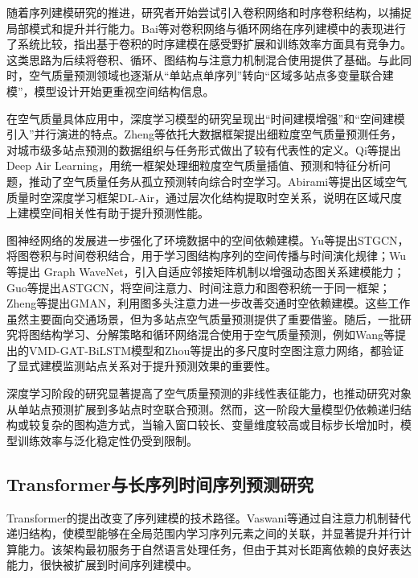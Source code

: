 随着序列建模研究的推进，研究者开始尝试引入卷积网络和时序卷积结构，以捕捉局部模式和提升并行能力。Bai等对卷积网络与循环网络在序列建模中的表现进行了系统比较，指出基于卷积的时序建模在感受野扩展和训练效率方面具有竞争力\cite{bai_empirical_2018}。这类思路为后续将卷积、循环、图结构与注意力机制混合使用提供了基础。与此同时，空气质量预测领域也逐渐从“单站点单序列”转向“区域多站点多变量联合建模”，模型设计开始更重视空间结构信息。

在空气质量具体应用中，深度学习模型的研究呈现出“时间建模增强”和“空间建模引入”并行演进的特点。Zheng等依托大数据框架提出细粒度空气质量预测任务，对城市级多站点预测的数据组织与任务形式做出了较有代表性的定义\cite{zheng_forecasting_2015}。Qi等提出 Deep Air Learning，用统一框架处理细粒度空气质量插值、预测和特征分析问题，推动了空气质量任务从孤立预测转向综合时空学习\cite{qi_deep_2018}。Abirami等提出区域空气质量时空深度学习框架DL-Air，通过层次化结构提取时空关系，说明在区域尺度上建模空间相关性有助于提升预测性能\cite{abirami_regional_2021}。

图神经网络的发展进一步强化了环境数据中的空间依赖建模。Yu等提出STGCN，将图卷积与时间卷积结合，用于学习图结构序列的空间传播与时间演化规律\cite{yu_spatio-temporal_2018}；Wu等提出 Graph WaveNet，引入自适应邻接矩阵机制以增强动态图关系建模能力\cite{wu_graph_2019}；Guo等提出ASTGCN，将空间注意力、时间注意力和图卷积统一于同一框架\cite{guo_attention_2019}；Zheng等提出GMAN，利用图多头注意力进一步改善交通时空依赖建模\cite{zheng_gman_2020}。这些工作虽然主要面向交通场景，但为多站点空气质量预测提供了重要借鉴。随后，一批研究将图结构学习、分解策略和循环网络混合使用于空气质量预测，例如Wang等提出的VMD-GAT-BiLSTM模型和Zhou等提出的多尺度时空图注意力网络，都验证了显式建模监测站点关系对于提升预测效果的重要性\cite{wang_air_2024,zhou_predicting_2024}。

深度学习阶段的研究显著提高了空气质量预测的非线性表征能力，也推动研究对象从单站点预测扩展到多站点时空联合预测。然而，这一阶段大量模型仍依赖递归结构或较复杂的图构造方式，当输入窗口较长、变量维度较高或目标步长增加时，模型训练效率与泛化稳定性仍受到限制。

\subsection{Transformer与长序列时间序列预测研究}

Transformer的提出改变了序列建模的技术路径。Vaswani等通过自注意力机制替代递归结构，使模型能够在全局范围内学习序列元素之间的关联，并显著提升并行计算能力\cite{vaswani_attention_2017}。该架构最初服务于自然语言处理任务，但由于其对长距离依赖的良好表达能力，很快被扩展到时间序列建模中。

